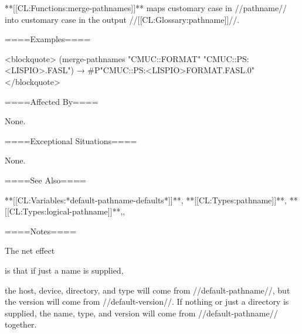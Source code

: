 **[[CL:Functions:merge-pathnames]]** maps customary case in //pathname// into customary case in the output //[[CL:Glossary:pathname]]//.

====Examples====

<blockquote> (merge-pathnames "CMUC::FORMAT" "CMUC::PS:<LISPIO>.FASL") → #P"CMUC::PS:<LISPIO>FORMAT.FASL.0" </blockquote>

====Affected By====

None.

====Exceptional Situations====

None.

====See Also====

**[[CL:Variables:*default-pathname-defaults*]]**, **[[CL:Types:pathname]]**, **[[CL:Types:logical-pathname]]**,{\secref\FileSystemConcepts},

{\secref\PathnamesAsFilenames}

====Notes====


The net effect

is that if just a name is supplied,

the host, device, directory, and type will come from //default-pathname//, but the version will come from //default-version//. If nothing or just a directory is supplied, the name, type, and version will come from //default-pathname// together.

            
